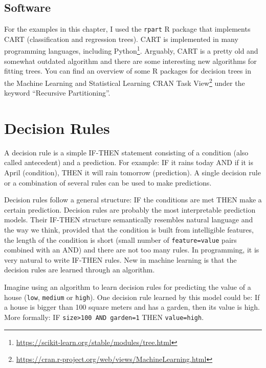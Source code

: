 \documentclass[12pt,]{krantz}
\renewcommand{\href}[2]{#2\footnote{\url{#1}}}
\begin{document}
\subsection{Software}\label{software-2}

For the examples in this chapter, I used the \texttt{rpart} R package
that implements CART (classification and regression trees). CART is
implemented in many programming languages, including
\href{https://scikit-learn.org/stable/modules/tree.html}{Python}.
Arguably, CART is a pretty old and somewhat outdated algorithm and there
are some interesting new algorithms for fitting trees. You can find an
overview of some R packages for decision trees in the
\href{https://cran.r-project.org/web/views/MachineLearning.html}{Machine
Learning and Statistical Learning CRAN Task View} under the keyword
``Recursive Partitioning''.

\newpage

\hypertarget{rules}{\section{Decision Rules}\label{rules}}

A decision rule is a simple IF-THEN statement consisting of a condition
(also called antecedent) and a prediction. For example: IF it rains
today AND if it is April (condition), THEN it will rain tomorrow
(prediction). A single decision rule or a combination of several rules
can be used to make predictions.

Decision rules follow a general structure: IF the conditions are met
THEN make a certain prediction. Decision rules are probably the most
interpretable prediction models. Their IF-THEN structure semantically
resembles natural language and the way we think, provided that the
condition is built from intelligible features, the length of the
condition is short (small number of \texttt{feature=value} pairs
combined with an AND) and there are not too many rules. In programming,
it is very natural to write IF-THEN rules. New in machine learning is
that the decision rules are learned through an algorithm.

Imagine using an algorithm to learn decision rules for predicting the
value of a house (\texttt{low}, \texttt{medium} or \texttt{high}). One
decision rule learned by this model could be: If a house is bigger than
100 square meters and has a garden, then its value is high. More
formally: IF \texttt{size\textgreater{}100\ AND\ garden=1} THEN
\texttt{value=high}.
\end{document}
